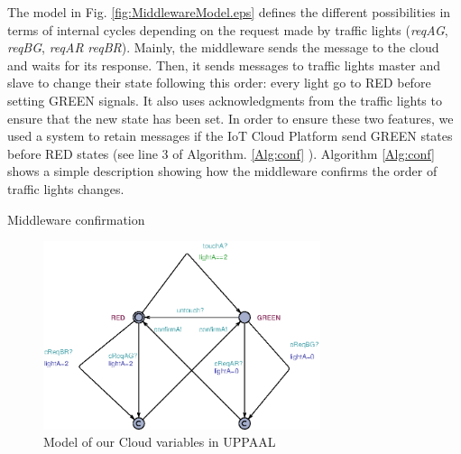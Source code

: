 \documentclass[conference]{../../setup/IEEEtran}
\begin{document}
The model in Fig. \ref{fig:MiddlewareModel.eps} defines the different possibilities in terms of internal cycles depending on the request made by traffic lights (\emph{reqAG}, \emph{reqBG}, \emph{reqAR} \emph{reqBR}). Mainly, the middleware sends the message to the cloud and waits for its response. Then, it sends messages to traffic lights master and slave to change their state following this order: every light go to RED before setting GREEN signals. It also uses acknowledgments from the traffic lights to ensure that the new state has been set. In order to ensure these two features, we used a system to retain messages if the IoT Cloud Platform send GREEN states before RED states (see line 3 of Algorithm. \ref{Alg:conf} ). Algorithm \ref{Alg:conf} shows a simple description showing how the middleware confirms the order of traffic lights changes.



\LinesNumbered \begin{algorithm}[ht] \caption{Middleware confirmation\label{Alg:conf}}
\end{algorithm}
\begin{figure}[!htb]
\centering
\includegraphics[width=3.2in]{res/CloudModel.eps}
\caption{Model of our Cloud variables in UPPAAL}
\label{fig:CloudModel.eps}
\end{figure}
\end{document}
